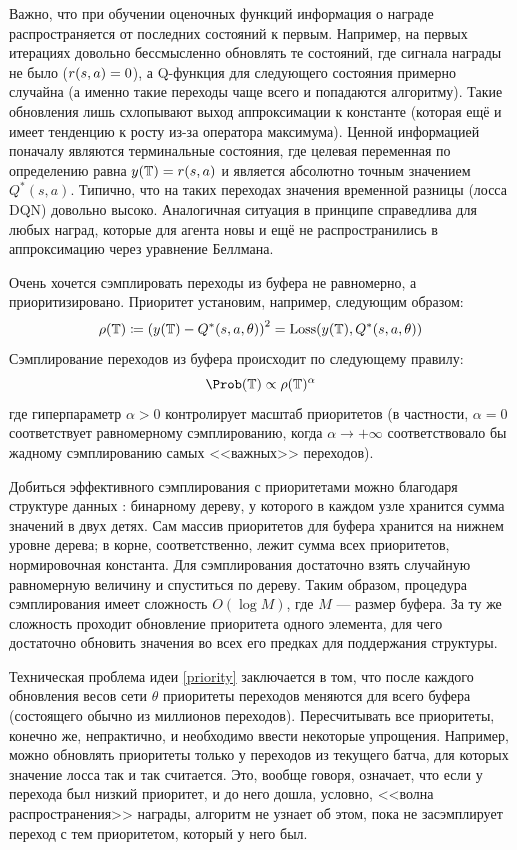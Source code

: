 Важно, что при обучении оценочных функций информация о награде распространяется от последних состояний к первым. Например, на первых итерациях довольно бессмысленно обновлять те состояний, где сигнала награды не было ($r(s, a) \HM= 0$), а Q-функция для следующего состояния примерно случайна (а именно такие переходы чаще всего и попадаются алгоритму). Такие обновления лишь схлопывают выход аппроксимации к константе (которая ещё и имеет тенденцию к росту из-за оператора максимума). Ценной информацией поначалу являются терминальные состояния, где целевая переменная по определению равна $y(\mathbb{T} ) = r(s, a)$ и является абсолютно точным значением $Q^*(s, a)$. Типично, что на таких переходах значения временной разницы (лосса DQN) довольно высоко. Аналогичная ситуация в принципе справедлива для любых наград, которые для агента новы и ещё не распространились в аппроксимацию через уравнение Беллмана.

Очень хочется сэмплировать переходы из буфера не равномерно, а приоритизировано. Приоритет установим, например, следующим образом:
\begin{equation}\label{priority}
    \rho(\mathbb{T} ) \coloneqq \left( y(\mathbb{T} ) - Q^*(s, a, \theta) \right)^2 = \operatorname{Loss}(y(\mathbb{T} ), Q^*(s, a, \theta))
\end{equation}
Сэмплирование переходов из буфера происходит по следующему правилу:
$$\Prob ( \T ) \propto \rho( \T )^\alpha$$
где гиперпараметр $\alpha > 0$ контролирует масштаб приоритетов (в частности, $\alpha = 0$ соответствует равномерному сэмплированию, когда $\alpha \to +\infty$ соответствовало бы жадному сэмплированию самых <<важных>> переходов).

\begin{remark}
Добиться эффективного сэмплирования с приоритетами можно благодаря структуре данных : бинарному дереву, у которого в каждом узле хранится сумма значений в двух детях. Сам массив приоритетов для буфера хранится на нижнем уровне дерева; в корне, соответственно, лежит сумма всех приоритетов, нормировочная константа. Для сэмплирования достаточно взять случайную равномерную величину и спуститься по дереву. Таким образом, процедура сэмплирования имеет сложность $O(\log M)$, где $M$ --- размер буфера. За ту же сложность проходит обновление приоритета одного элемента, для чего достаточно обновить значения во всех его предках для поддержания структуры.
\end{remark}

Техническая проблема идеи \eqref{priority} заключается в том, что после каждого обновления весов сети $\theta$ приоритеты переходов меняются для всего буфера (состоящего обычно из миллионов переходов). Пересчитывать все приоритеты, конечно же, непрактично, и необходимо ввести некоторые упрощения. Например, можно обновлять приоритеты только у переходов из текущего батча, для которых значение лосса так и так считается. Это, вообще говоря, означает, что если у перехода был низкий приоритет, и до него дошла, условно, <<волна распространения>> награды, алгоритм не узнает об этом, пока не засэмплирует переход с тем приоритетом, который у него был.

